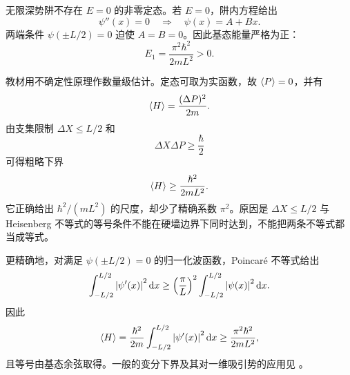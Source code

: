 

无限深势阱不存在 $E=0$ 的非零定态。若 $E=0$，阱内方程给出
\begin{equation}
  \psi''(x)=0
  \quad\Longrightarrow\quad
  \psi(x)=A+Bx.
  \label{eq:QM-C05-S02-zero-energy-linear}
\end{equation}
两端条件 $\psi(\pm L/2)=0$ 迫使 $A=B=0$。因此基态能量严格为正：
\begin{equation}
  E_1=\frac{\pi^2\hbar^2}{2mL^2}>0.
  \label{eq:QM-C05-S02-ground-energy}
\end{equation}

教材用不确定性原理作数量级估计。定态可取为实函数，故 $\left\langle P \right\rangle=0$，并有
\begin{equation}
  \left\langle H \right\rangle=\frac{(\Delta P)^2}{2m}.
  \label{eq:QM-C05-S02-energy-from-delta-p}
\end{equation}
由支集限制 $\Delta X\leq L/2$ 和
\begin{equation}
  \Delta X\Delta P\geq\frac\hbar2
  \label{eq:QM-C05-S02-uncertainty-bound}
\end{equation}
可得粗略下界
\begin{equation}
  \left\langle H \right\rangle\geq\frac{\hbar^2}{2mL^2}.
  \label{eq:QM-C05-S02-rough-ground-bound}
\end{equation}
它正确给出 $\hbar^2/(mL^2)$ 的尺度，却少了精确系数 $\pi^2$。原因是 $\Delta X\leq L/2$ 与 Heisenberg 不等式的等号条件不能在硬墙边界下同时达到，不能把两条不等式都当成等式。

更精确地，对满足 $\psi(\pm L/2)=0$ 的归一化波函数，Poincar\'e 不等式给出
\begin{equation}
  \int_{-L/2}^{L/2}\left|\psi'(x)\right|^2\mathop{}\!\mathrm{d} x
  \geq
  \left(\frac\pi L\right)^2
  \int_{-L/2}^{L/2}\left|\psi(x)\right|^2\mathop{}\!\mathrm{d} x.
  \label{eq:QM-C05-S02-poincare-inequality}
\end{equation}
因此
\begin{equation}
  \left\langle H \right\rangle
  =\frac{\hbar^2}{2m}
  \int_{-L/2}^{L/2}\left|\psi'(x)\right|^2\mathop{}\!\mathrm{d} x
  \geq\frac{\pi^2\hbar^2}{2mL^2},
  \label{eq:QM-C05-S02-exact-variational-bound}
\end{equation}
且等号由基态余弦取得。一般的变分下界及其对一维吸引势的应用见
。

